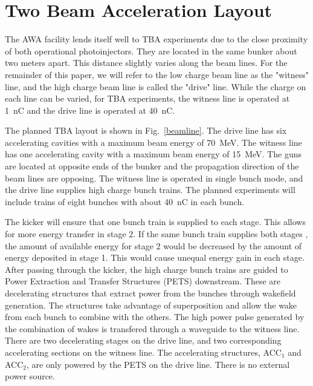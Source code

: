 \documentclass[letterpaper,  %
              ]{jacow-2_3}   %
\begin{document}
\section{Two Beam Acceleration Layout}
The AWA facility lends itself well to TBA experiments due to the 
close proximity of both operational photoinjectors. 
They are located in the same bunker about two meters apart.
This distance slightly varies along the beam 
lines. For the remainder of this paper, we will
refer to the low charge beam line as the "witness" line, 
and the high charge beam line is called the "drive" line.
While the charge on each line can be varied, for TBA experiments, 
the witness line is operated at \SI{1}{nC} and the drive line
is operated at \SI{40}{nC}.

The planned TBA layout is shown in Fig.~\ref{beamline}.
The drive line has six accelerating 
cavities with a maximum beam energy of \SI{70}{MeV}. 
The witness line has one accelerating cavity with a maximum beam energy of \SI{15}{MeV}.
The guns are located at opposite ends of the bunker and 
the propagation direction of the beam lines are opposing.
The witness line is operated in single bunch mode, and 
the drive line supplies high charge bunch trains. 
The planned experiments will include trains of eight bunches
with about \SI{40}{nC} in each bunch.

\begin{figure*}[!tbh]
	\centering
	\begin{tikzpicture}[scale=\textwidth/33cm, text=black]
	
	\end{tikzpicture}
	\caption{TBA beam line layout at the AWA. The arrow at the end of each line indicates what direction the beam is traveling.
		PETS stands for Power Extraction and Transfer Structure, and ACC
		stands for Accelerating structure. The subscript index on each structure refers to which stage the structures belong to, first or second stage. }
	\label{beamline}
\end{figure*}

The kicker will ensure that one bunch train is supplied to 
each stage. This allows for more energy transfer in stage 2.
If the same bunch train supplies both stages \cite{tba}, the amount
of available energy for stage 2 would be decreased by the 
amount of energy deposited in stage 1. This would cause
unequal energy gain in each stage.
After passing through the kicker, 
the high charge bunch trains are guided to Power Extraction
and Transfer Structures (PETS) downstream. These are decelerating 
structures that extract power from the bunches through wakefield generation.
The structures take advantage of superposition and allow the wake from each 
bunch to combine with the others. The high power pulse generated by 
the combination of wakes is transfered through a waveguide to the 
witness line. 
There are two decelerating stages on the drive line, and two 
corresponding accelerating sections on the witness line.
The accelerating structures, ACC$_1$ and ACC$_2$, are only 
powered by the PETS on the drive line. There is no  
external power source. 
\end{document}

